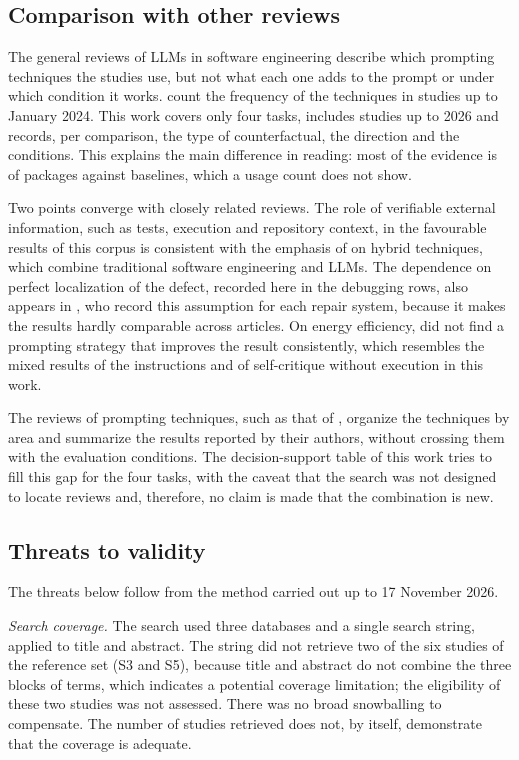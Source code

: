\subsection{Comparison with other reviews}\label{sec:comparacao}
The general reviews of LLMs in software engineering describe which prompting techniques the studies use, but not
what each one adds to the prompt or under which condition it works. \citet{hou2024slr} count the frequency
of the techniques in studies up to January 2024. This work covers only four tasks, includes studies up to 2026 and
records, per comparison, the type of counterfactual, the direction and the conditions. This explains the main difference in
reading: most of the evidence is of packages against baselines, which a usage count does not show.

Two points converge with closely related reviews.
The role of verifiable external information, such as tests, execution and repository context, in the favourable
results of this corpus is consistent with the emphasis of \citet{fan2023survey} on hybrid techniques, which
combine traditional software engineering and LLMs.
The dependence on perfect localization of the defect, recorded here in the debugging rows, also appears in
\citet{yang2025aprsurvey}, who record this assumption for each repair system, because it makes the
results hardly comparable across articles.
On energy efficiency, \citet{masthanali2026energy} did not find a prompting strategy
that improves the result consistently, which resembles the mixed results of the instructions and of
self-critique without execution in this work.

The reviews of prompting techniques, such as that of \citet{sahoo2024survey}, organize the techniques by area
and summarize the results reported by their authors, without crossing them with the evaluation conditions. The decision-support table
of this work tries to fill this gap for the four tasks, with the caveat that the search was not designed
to locate reviews and, therefore, no claim is made that the combination is new.

\subsection{Threats to validity}\label{sec:ameacas}
The threats below follow from the method carried out up to 17 November 2026.

\textit{Search coverage.} The search used three databases and a single search string, applied to title and abstract. The string
did not retrieve two of the six studies of the reference set (S3 and S5), because title and abstract do not combine the
three blocks of terms, which indicates a potential coverage limitation; the eligibility of these two studies was not
assessed. There was no broad snowballing to compensate.
The number of studies retrieved does not, by itself, demonstrate that the coverage is adequate.

